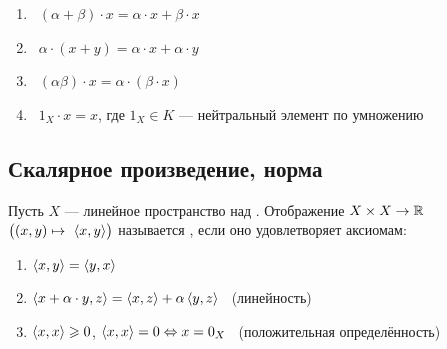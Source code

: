 \begin{opr}
\begin{enumerate}
		\item {} \  $(\alpha + \beta) \cdot x =\alpha \cdot x + \beta \cdot x$
		
		\item {} \  $\alpha \cdot (x + y) = \alpha \cdot x + \alpha \cdot y$
		
		\item {} \  $(\alpha \beta) \cdot x = \alpha \cdot (\beta \cdot x)$
		
		\item {} \  $1_X \cdot x = x$, где $1_X \in K$ --- нейтральный элемент по умножению 
	\end{enumerate} %
\end{opr} %

\subsection{Скалярное произведение, норма}

\begin{opr} %
	Пусть $X$ --- линейное пространство над \rr. Отображение $X \times X \to \mathbb R$ \ {\small $\bigl((x, y) \mapsto~\left<x,y\right>\bigr)$} называется , если оно удовлетворяет аксиомам:
	\begin{enumerate} %
		\item {} 
		$\left<x, y\right> = \left<y,x\right>$
		
		\item\label{скал:лин.}  
		$\left<x + \alpha\cdot y, z\right> = \left<x, z\right> + \alpha\left<y,z\right>$
		\ {\footnotesize(линейность)}
		
		\item\label{скал:пол.опр.} 
		$\left<x, x\right> \geqslant 0$, \quad $\left<x, x\right> = 0 \Leftrightarrow x = 0_X$
		\ {\footnotesize(положительная определённость)}
	\end{enumerate} %
\end{opr} %

